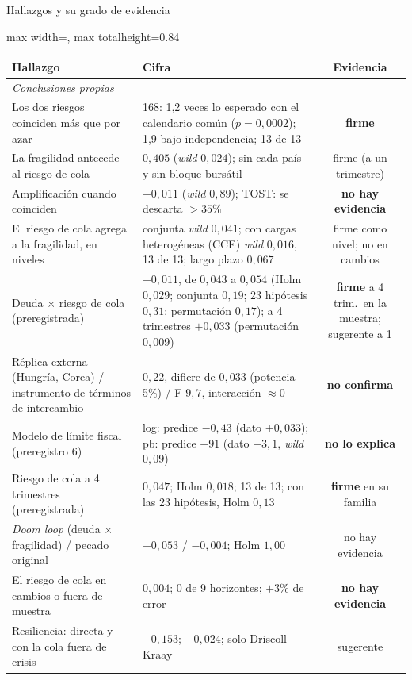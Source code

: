 \documentclass[aspectratio=169]{beamer}
\begin{document}
\begin{frame}{Hallazgos y su grado de evidencia}
\centering
\footnotesize
\begin{adjustbox}{max width=\textwidth, max totalheight=0.84\textheight}
\begin{tabular}{llc}
\toprule
Hallazgo & Cifra & Evidencia \\
\midrule
\multicolumn{3}{l}{\textit{Conclusiones propias}} \\
Los dos riesgos coinciden más que por azar & 168: 1,2 veces lo esperado con el calendario común ($p=0{,}0002$); 1,9 bajo independencia; 13 de 13 & \textbf{firme} \\
La fragilidad antecede al riesgo de cola & $0{,}405$ (\textit{wild} $0{,}024$); sin cada país y sin bloque bursátil & firme (a un trimestre) \\
Amplificación cuando coinciden & $-0{,}011$ (\textit{wild} $0{,}89$); TOST: se descarta $>35\%$ & \textbf{no hay evidencia} \\
El riesgo de cola agrega a la fragilidad, en niveles & conjunta \textit{wild} $0{,}041$; con cargas heterogéneas (CCE) \textit{wild} $0{,}016$, 13 de 13; largo plazo $0{,}067$ & firme como nivel; no en cambios \\
Deuda $\times$ riesgo de cola (preregistrada) & $+0{,}011$, de $0{,}043$ a $0{,}054$ (Holm $0{,}029$; conjunta $0{,}19$; 23 hipótesis $0{,}31$; permutación $0{,}17$); a 4 trimestres $+0{,}033$ (permutación $0{,}009$) & \textbf{firme} a 4 trim.\ en la muestra; sugerente a 1 \\
Réplica externa (Hungría, Corea) / instrumento de términos de intercambio & $0{,}22$, difiere de $0{,}033$ (potencia 5\%) / F $9{,}7$, interacción $\approx0$ & \textbf{no confirma} \\
Modelo de límite fiscal (preregistro 6) & log: predice $-0{,}43$ (dato $+0{,}033$); pb: predice $+91$ (dato $+3{,}1$, \textit{wild} $0{,}09$) & \textbf{no lo explica} \\
Riesgo de cola a 4 trimestres (preregistrada) & $0{,}047$; Holm $0{,}018$; 13 de 13; con las 23 hipótesis, Holm $0{,}13$ & \textbf{firme} en su familia \\
\textit{Doom loop} (deuda $\times$ fragilidad) / pecado original & $-0{,}053$ / $-0{,}004$; Holm $1{,}00$ & no hay evidencia \\
El riesgo de cola en cambios o fuera de muestra & $0{,}004$; 0 de 9 horizontes; $+3\%$ de error & \textbf{no hay evidencia} \\
Resiliencia: directa y con la cola fuera de crisis & $-0{,}153$; $-0{,}024$; solo Driscoll--Kraay & sugerente \\

\end{tabular}
\end{adjustbox}
\end{frame}
\end{document}
